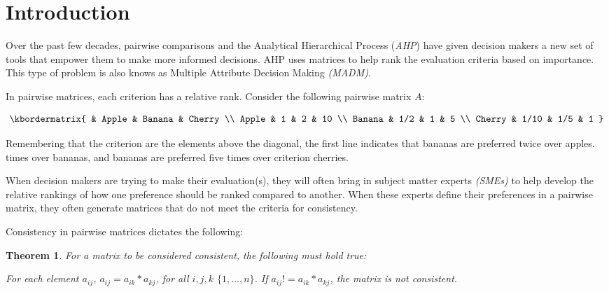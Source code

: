 \documentclass[12pt]{amsart}
\newtheorem{theorem}{Theorem}
\theoremstyle{definition}
\begin{document}
\newpage
\tableofcontents
\newpage
\newpage



\section{Introduction}

Over the past few decades, pairwise comparisons and the Analytical Hierarchical Process (\textit{AHP}) have given decision makers a new set of tools that empower them to make more informed decisions.  AHP uses matrices to help rank the evaluation criteria based on importance.  This type of problem is also knows as Multiple Attribute Decision Making \textit{(MADM)}.

In pairwise matrices, each criterion has a relative rank.  Consider the following pairwise matrix $A$:
\begin{center}
\[
\kbordermatrix{
    & Apple & Banana & Cherry \\
    Apple & 1 & 2 & 10 \\
    Banana & 1/2 & 1 & 5  \\
    Cherry & 1/10 & 1/5 & 1 
  }
\]

\end{center}

Remembering that the criterion are the elements above the diagonal, the first line indicates that bananas are preferred twice over apples.  times over bananas, and bananas are preferred five times over criterion cherries.

When decision makers are trying to make their evaluation(s), they will often bring in subject matter experts \textit{(SMEs)} to help develop the relative rankings of how one preference should be ranked compared to another.  When these experts define their preferences in a pairwise matrix, they often generate matrices that do not meet the criteria for consistency.

Consistency in pairwise matrices dictates the following:
\begin{theorem}
For a matrix to be considered consistent, the following must hold true:

For each element $a_{ij}$, $a_{ij}=a_{ik}*a_{kj}$, for all $i,j,k$ $\{1,\dots,n\}$. If $a_{ij}!=a_{ik}*a_{kj}$, the matrix is not consistent.
\end{theorem}
\end{document}
